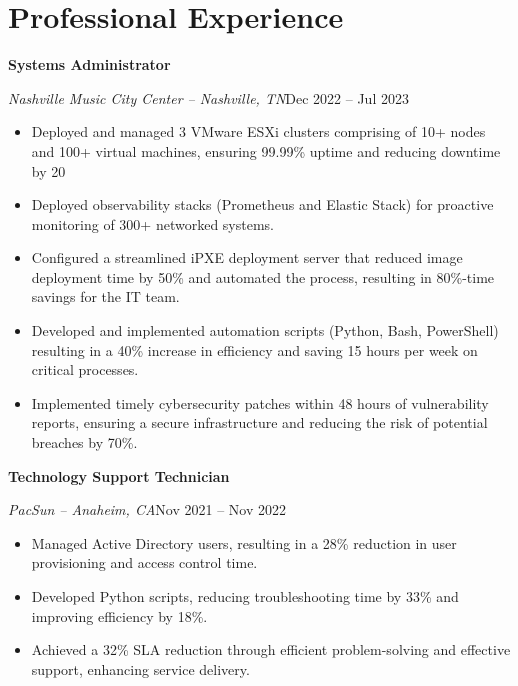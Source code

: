\documentclass[a4paper]{article}
\begin{document}
\begin{minipage}[t]{0.62\textwidth}
    \raggedright
    \vspace*{0pt}

    \section{Professional Experience}
    \textbf{Systems Administrator}\par
    \textit{Nashville Music City Center -- Nashville, TN}\hfill Dec 2022 -- Jul 2023

    \begin{itemize}[noitemsep,nolistsep]
        \item Deployed and managed 3 VMware ESXi clusters comprising of 10+ nodes and 100+ virtual machines, ensuring 99.99\% uptime and reducing downtime by 20%
        \item Deployed observability stacks (Prometheus and Elastic Stack) for proactive monitoring of 300+ networked systems.
        \item Configured a streamlined iPXE deployment server that reduced image deployment time by 50\% and automated the process, resulting in 80\%-time savings for the IT team.
        \item Developed and implemented automation scripts (Python, Bash, PowerShell) resulting in a 40\% increase in efficiency and saving 15 hours per week on critical processes.
        \item Implemented timely cybersecurity patches within 48 hours of vulnerability reports, ensuring a secure infrastructure and reducing the risk of potential breaches by 70\%.
    \end{itemize}

    \vspace{0.5em}
    \textbf{Technology Support Technician}\par
    \textit{PacSun -- Anaheim, CA}\hfill Nov 2021 -- Nov 2022

    \begin{itemize}[noitemsep,nolistsep]
        \item Managed Active Directory users, resulting in a 28\% reduction in user provisioning and access control time.
        \item Developed Python scripts, reducing troubleshooting time by 33\% and improving efficiency by 18\%.
        \item Achieved a 32\% SLA reduction through efficient problem-solving and effective support, enhancing service delivery.
    \end{itemize}


\end{minipage}
\end{document}
